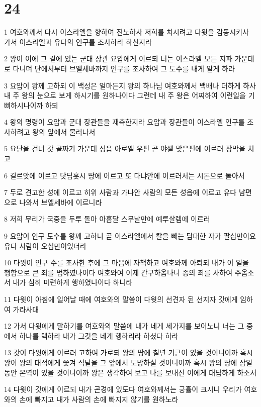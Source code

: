 \chapter{24}

\par 1 여호와께서 다시 이스라엘을 향하여 진노하사 저희를 치시려고 다윗을 감동시키사 가서 이스라엘과 유다의 인구를 조사하라 하신지라
\par 2 왕이 이에 그 곁에 있는 군대 장관 요압에게 이르되 너는 이스라엘 모든 지파 가운데로 다니며 단에서부터 브엘세바까지 인구를 조사하여 그 도수를 내게 알게 하라
\par 3 요압이 왕께 고하되 이 백성은 얼마든지 왕의 하나님 여호와께서 백배나 더하게 하사 내 주 왕의 눈으로 보게 하시기를 원하나이다 그런데 내 주 왕은 어찌하여 이런일을 기뻐하시나이까 하되
\par 4 왕의 명령이 요압과 군대 장관들을 재촉한지라 요압과 장관들이 이스라엘 인구를 조사하려고 왕의 앞에서 물러나서
\par 5 요단을 건너 갓 골짜기 가운데 성읍 아로엘 우편 곧 야셀 맞은편에 이르러 장막을 치고
\par 6 길르앗에 이르고 닷딤홋시 땅에 이르고 또 다냐안에 이르러서는 시돈으로 돌아서
\par 7 두로 견고한 성에 이르고 히위 사람과 가나안 사람의 모든 성읍에 이르고 유다 남편으로 나와서 브엘세바에 이르니라
\par 8 저희 무리가 국중을 두루 돌아 아홉달 스무날만에 예루살렘에 이르러
\par 9 요압이 인구 도수를 왕께 고하니 곧 이스라엘에서 칼을 빼는 담대한 자가 팔십만이요 유다 사람이 오십만이었더라
\par 10 다윗이 인구 수를 조사한 후에 그 마음에 자책하고 여호와께 아뢰되 내가 이 일을 행함으로 큰 죄를 범하였나이다 여호와여 이제 간구하옵나니 종의 죄를 사하여 주옵소서 내가 심히 미련하게 행하였나이다 하니라
\par 11 다윗이 아침에 일어날 때에 여호와의 말씀이 다윗의 선견자 된 선지자 갓에게 임하여 가라사대
\par 12 가서 다윗에게 말하기를 여호와의 말씀에 내가 네게 세가지를 보이노니 너는 그 중에서 하나를 택하라 내가 그것을 네게 행하리라 하셨다 하라
\par 13 갓이 다윗에게 이르러 고하여 가로되 왕의 땅에 칠년 기근이 있을 것이니이까 혹시 왕이 왕의 대적에게 쫓겨 석달을 그 앞에서 도망하실 것이니이까 혹시 왕의 땅에 삼일동안 온역이 있을 것이니이까 왕은 생각하여 보고 나를 보내신 이에게 대답하게 하소서
\par 14 다윗이 갓에게 이르되 내가 곤경에 있도다 여호와께서는 긍휼이 크시니 우리가 여호와의 손에 빠지고 내가 사람의 손에 빠지지 않기를 원하노라

